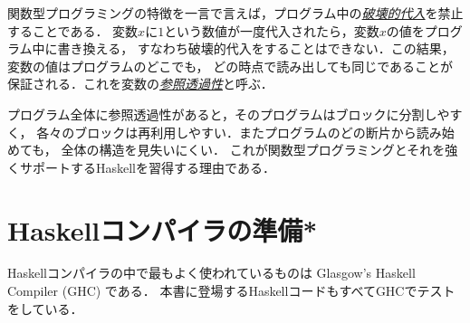 \documentclass[a5paper,draft]{jsbook}
\newcommand{\programminglanguage}[1]{\textsf{#1}}
\newcommand{\haskell}{\programminglanguage{Haskell}}
\newcommand{\keyword}[1]{{\underline{\emph{#1}}}}
\begin{document}
関数型プログラミングの特徴を一言で言えば，プログラム中の\keyword{破壊的代入}を禁止することである．
変数$x$に$1$という数値が一度代入されたら，変数$x$の値をプログラム中に書き換える，
すなわち破壊的代入をすることはできない．この結果，変数の値はプログラムのどこでも，
どの時点で読み出しても同じであることが保証される．これを変数の\keyword{参照透過性}と呼ぶ．

プログラム全体に参照透過性があると，そのプログラムはブロックに分割しやすく，
各々のブロックは再利用しやすい．またプログラムのどの断片から読み始めても，
全体の構造を見失いにくい．
これが関数型プログラミングとそれを強くサポートする\haskell を習得する理由である．







\section{\haskell コンパイラの準備*}

\haskell コンパイラの中で最もよく使われているものは Glasgow's Haskell Compiler (GHC) である．
本書に登場する\haskell コードもすべてGHCでテストをしている．
\end{document}
